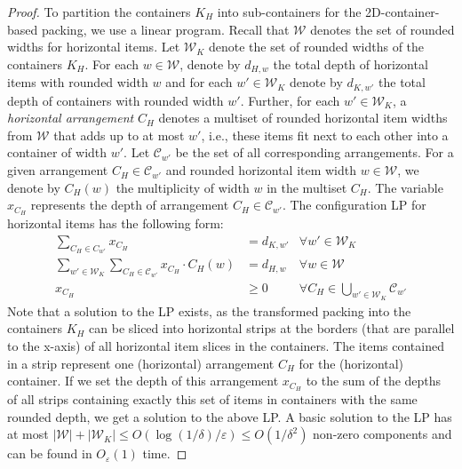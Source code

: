 \documentclass[a4paper,UKenglish,cleveref, autoref, thm-restate]{lipics-v2021}
\newcommand{\eps}{\varepsilon}
\begin{document}
\begin{proof}
To partition the containers $K_H$ into sub-containers for the 2D-container-based packing, we use a linear program. 
Recall that $\mathcal{W}$ denotes the set of rounded widths for horizontal items. 
Let $\mathcal{W}_{K}$ denote the set of rounded widths of the containers $K_H$.
For each $w \in \mathcal{W}$, denote by $d_{H,w}$ the total depth of horizontal items with rounded width $w$ and for each $w' \in \mathcal{W}_K$ denote by $d_{K,w'}$ the total depth of containers with rounded width $w'$.
Further, for each $w' \in \mathcal{W}_K$, a {\em horizontal arrangement} $C_H$ denotes a multiset of rounded horizontal item widths from $\mathcal{W}$ that adds up to at most $w'$, i.e., these items fit next to each other into a container of width $w'$.
Let  $\mathcal{C}_{w'}$ be the set of all corresponding arrangements. 
For a given arrangement $C_H \in \mathcal{C}_{w'}$ and rounded horizontal item width $w \in \mathcal{W}$, we denote by $C_H(w)$ the multiplicity of width $w$ in the multiset $C_H$.
The variable $x_{C_H}$ represents the depth of arrangement $C_H \in \mathcal{C}_{w'}$. 
The configuration LP for horizontal items has the following form: 
\begin{align*}
    \sum_{C_H \in C_{w'}} x_{C_H} & = d_{K,w'} &\forall w' \in \mathcal{W}_K\\
    \sum_{w' \in \mathcal{W}_K}\sum_{C_H \in \mathcal{C}_{w'}} x_{C_H} \cdot C_H(w) &= d_{H,w} &\forall w \in \mathcal{W}\\
    x_{C_H} &\geq 0 &\forall C_H \in \bigcup_{w' \in \mathcal{W}_K} \mathcal{C}_{w'}
\end{align*}
Note that a solution to the LP exists, as the transformed packing into the containers $K_H$ can be sliced into horizontal strips at the borders (that are parallel to the x-axis) of all horizontal item slices in the containers. 
The items contained in a strip represent one (horizontal)  arrangement $C_H$ for the (horizontal) container. 
If we set the depth of this arrangement $x_{C_H}$ to the sum of the depths of all strips containing exactly this set of items in containers with the same rounded depth, we get a solution to the above LP.
A basic solution to the LP has at most $|\mathcal{W}| + |\mathcal{W}_K| \le O(\log(1/\delta)/\eps) \le O(1/\delta^2)$ non-zero components and can be found in ${O}_{\eps}(1)$ time.


\end{proof}
\end{document}
